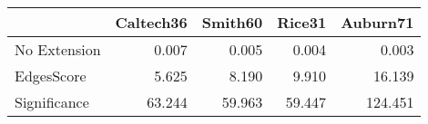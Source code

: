 \begin{tabular}{lrrrr}
\toprule
{} & Caltech36 & Smith60 & Rice31 & Auburn71 \\
\midrule
No Extension &     0.007 &   0.005 &  0.004 &    0.003 \\
EdgesScore   &     5.625 &   8.190 &  9.910 &   16.139 \\
Significance &    63.244 &  59.963 & 59.447 &  124.451 \\
\bottomrule
\end{tabular}
